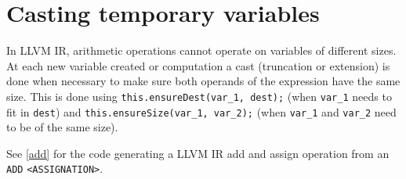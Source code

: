 \section{Casting temporary variables}
\label{sec:cast}

In LLVM IR, arithmetic operations cannot operate on variables of different sizes. At each new variable created or computation a cast (truncation or extension) is done when necessary to make sure both operands of the expression have the same size. This is done using \verb!this.ensureDest(var_1, dest);! (when \verb!var_1! needs to fit in \verb!dest!) and \verb!this.ensureSize(var_1, var_2);! (when \verb!var_1! and \verb!var_2! need to be of the same size).

See \ref{add} for the code generating a LLVM IR add and assign operation from an \verb!ADD! \verb!<ASSIGNATION>!.

